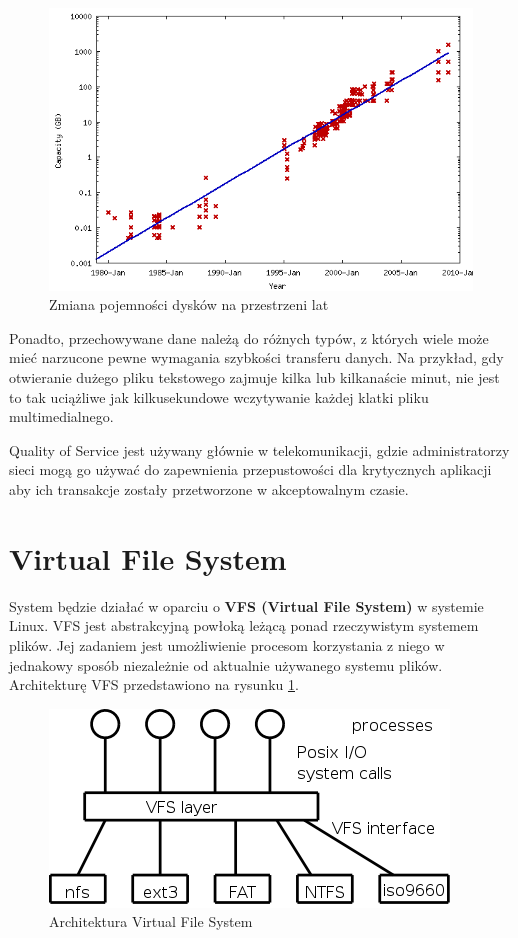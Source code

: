\begin{figure}[h!]
	\centering
	\includegraphics[scale=0.5]{HDDOverTime.png}
		\caption{Zmiana pojemności dysków na przestrzeni lat}
\end{figure}

Ponadto, przechowywane dane należą do różnych typów, z których wiele może mieć narzucone pewne wymagania
szybkości transferu danych. Na przykład, gdy otwieranie dużego pliku tekstowego zajmuje kilka lub
kilkanaście minut, nie jest to tak uciążliwe jak kilkusekundowe wczytywanie każdej klatki
pliku multimedialnego.

Quality of Service jest używany głównie w telekomunikacji, gdzie administratorzy
sieci mogą go używać do zapewnienia przepustowości dla krytycznych aplikacji aby ich transakcje zostały przetworzone w akceptowalnym czasie.

\section{Virtual File System}
System będzie działać w oparciu o
\textbf{VFS (Virtual File System)} w systemie Linux. VFS jest abstrakcyjną powłoką
leżącą ponad rzeczywistym systemem plików. Jej zadaniem jest umożliwienie procesom korzystania z niego w jednakowy sposób niezależnie od
aktualnie używanego systemu plików. Architekturę  VFS przedstawiono na rysunku \ref{fig:vfs}.

\begin{figure}[h!]
	\centering
	\includegraphics[scale=0.5]{vfs.png}
	\caption{Architektura Virtual File System}
    \label{fig:vfs}
\end{figure}

